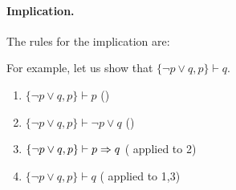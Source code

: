 \paragraph{Implication.}

The rules for the implication are:

\begin{prooftree}
\end{prooftree}

\begin{prooftree}
\end{prooftree}

\begin{prooftree}
\end{prooftree}

\begin{prooftree}
\end{prooftree}

For example, let us show that $\{\neg p\vee q,p\}\vdash q$.
\begin{enumerate}
    \item $\{\neg p\vee q, p\}\vdash p$ \hfill ()
    \item $\{\neg p\vee q, p\}\vdash \neg p\vee q$ \hfill ()
    \item $\{\neg p\vee q, p\}\vdash p\imp q$ \hfill ( applied to 2)
    \item $\{\neg p\vee q, p\}\vdash q$ \hfill ( applied to 1,3)
\end{enumerate}

